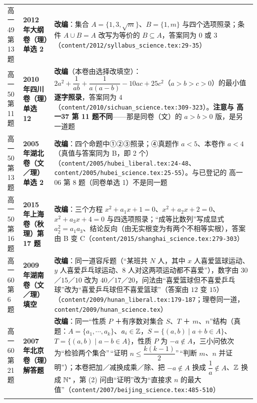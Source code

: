 \documentclass[a4paper,11pt]{article}
\begin{document}
\begin{xltabular}{\textwidth}{@{}>{\raggedright\arraybackslash}p{2.85cm}>{\raggedright\arraybackslash}p{3.99cm}>{\raggedright\arraybackslash}p{7.89cm}@{}}
高一49 第 13 题 & \textbf{2012 年大纲卷（理）单选 2} & \textbf{改编}：集合 \(A=\allowbreak \{1,\allowbreak 3,\allowbreak \sqrt m\}\)、\(B=\allowbreak \{1,m\}\) 与四个选项照录；条件 \(A\cup\allowbreak  B=A\) 改写为等价的 \(B\subseteq\allowbreak  A\)，答案同为 \(0\) 或 \(3\)（\texttt{content/\allowbreak{}2012/\allowbreak{}syllabus\_science.tex:29-\allowbreak{}35}） \\ \addlinespace[1pt]
高一50 第 11 题 & \textbf{2010 年四川卷（理）单选 12} & \textbf{改编}（本卷由选择改填空）：\(2a^2+\allowbreak \dfrac1{ab}+\allowbreak \dfrac1{a(a-b)}-10ac+\allowbreak 25c^2\)（\(a>b>c>0\)）的最小值\textbf{逐字照录}，答案同为 \(4\)（\texttt{content/\allowbreak{}2010/\allowbreak{}sichuan\_science.tex:309-\allowbreak{}323}）。\textbf{注意与 高一37 第 11 题不同}------那是同卷（文）的 \(a>b>0\) 版，是另一道题 \\ \addlinespace[1pt]
高一50 第 13 题 & \textbf{2005 年湖北卷（文／理）单选 2} & \textbf{改编}：四个命题中①②③照录；④真题作 \(a<5\)、本卷作 \(a<4\)（真值与答案同为 B，即 2 个）（\texttt{content/\allowbreak{}2005/\allowbreak{}hubei\_liberal.tex:24-\allowbreak{}48}、\texttt{content/\allowbreak{}2005/\allowbreak{}hubei\_science.tex:25-\allowbreak{}55}）。与已登记的 高一06 第 8 题（同卷单选 1）不是同一题 \\ \addlinespace[1pt]
高一50 第 16 题 & \textbf{2015 年上海卷（秋理）第 17 题} & \textbf{改编}：三个方程 \(x^2+a_1x+\allowbreak 1=\allowbreak 0\)、\(x^2+a_2x+\allowbreak 2=\allowbreak 0\)、\(x^2+a_3x+\allowbreak 4=\allowbreak 0\) 与四选项照录；``成等比数列''写成显式 \(a_2^2=a_1a_3\)、结论反向（由无实根变为有两个不相等实根），答案由 B 变 C（\texttt{content/\allowbreak{}2015/\allowbreak{}shanghai\_science.tex:279-\allowbreak{}303}） \\ \addlinespace[1pt]
高一60 第 6 题 & \textbf{2009 年湖南卷（文／理）填空} & \textbf{改编}：同一道容斥题（``某班共 \(N\) 人，其中 \(x\) 人喜爱篮球运动、\(y\) 人喜爱乒乓球运动、\(8\) 人对这两项运动都不喜爱''），数字由 \(30\)／\(15\)／\(10\) 改为 \(40\)／\(17\)／\(20\)，问法由``喜爱篮球但不喜爱乒乓球''改为``喜爱乒乓球但不喜爱篮球''（答案由 \(12\) 变 \(15\)）（\texttt{content/\allowbreak{}2009/\allowbreak{}hunan\_liberal.tex:179-\allowbreak{}187}；理卷同一道，\texttt{content/\allowbreak{}2009/\allowbreak{}hunan\_science.tex}） \\ \addlinespace[1pt]
高一60 第 21 题 & \textbf{2007 年北京卷（理）解答题} & \textbf{改编}：同一``性质 \(P\) ＋有序数对集合 \(S\)、\(T\) ＋ \(m\)、\(n\)''结构（真题：\(A=\allowbreak \{a_1,\allowbreak \cdots,a_k\}\)、\(a_i\in\mathbb{Z}\)，\(S=\allowbreak \{(a,b)\mid\allowbreak  a+b\in A\}\)、\(T=\allowbreak \{(a,b)\mid\allowbreak  a-b\in A\}\)，性质 \(P\) 为 \(-a\notin A\)，三小问依次为``检验两个集合''\,``证明 \(n\leqslant\allowbreak \dfrac{k(k-1)}2\)''\,``判断 \(m\)、\(n\) 并证明''）；本卷把加／减换成乘／除、把 \(-a\notin A\) 换成 \(\dfrac1a\notin A\)、\(\mathbb{Z}\) 换成 \(\mathbb{N}^*\)，第 (2) 问由``证明''改为``直接求 \(n\) 的最大值''（\texttt{content/\allowbreak{}2007/\allowbreak{}beijing\_science.tex:485-\allowbreak{}510}） \\ \addlinespace[1pt]

\end{xltabular}
\end{document}
